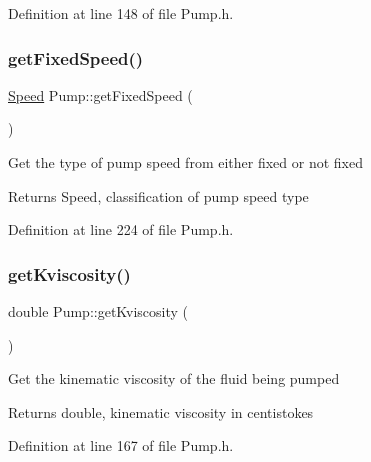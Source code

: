 Definition at line 148 of file Pump.\+h.

\mbox{\label{class_pump_ae9a63b7e616ba2ef7723d1040af241b4}} 
\subsubsection{\texorpdfstring{get\+Fixed\+Speed()}{getFixedSpeed()}}
{\footnotesize\ttfamily \hyperlink{class_pump_ae443603074ebca82f0b89209482d10b6}{Speed} Pump\+::get\+Fixed\+Speed (\begin{DoxyParamCaption}{ }\end{DoxyParamCaption})\hspace{0.3cm}{\ttfamily [inline]}}

Get the type of pump speed from either fixed or not fixed

\begin{DoxyReturn}{Returns}
Speed, classification of pump speed type 
\end{DoxyReturn}


Definition at line 224 of file Pump.\+h.

\mbox{\label{class_pump_a7b834ffb06cbfd643043e3a26ca1af6e}} 
\subsubsection{\texorpdfstring{get\+Kviscosity()}{getKviscosity()}}
{\footnotesize\ttfamily double Pump\+::get\+Kviscosity (\begin{DoxyParamCaption}{ }\end{DoxyParamCaption})\hspace{0.3cm}{\ttfamily [inline]}}

Get the kinematic viscosity of the fluid being pumped

\begin{DoxyReturn}{Returns}
double, kinematic viscosity in centistokes 
\end{DoxyReturn}


Definition at line 167 of file Pump.\+h.

\mbox{\label{class_pump_a66870deae37979d64a910b89c6977b26}} 

